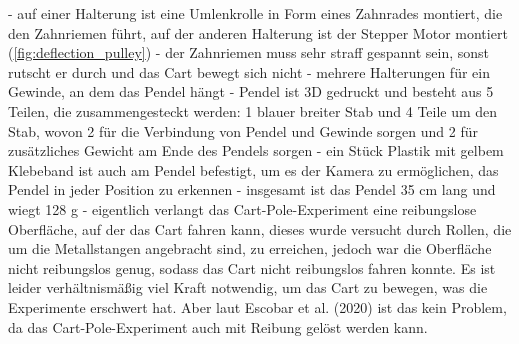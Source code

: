 - auf einer Halterung ist eine Umlenkrolle in Form eines Zahnrades montiert, die den Zahnriemen führt, auf der anderen Halterung ist der Stepper Motor montiert (\ref{fig:deflection_pulley})
- der Zahnriemen muss sehr straff gespannt sein, sonst rutscht er durch und das Cart bewegt sich nicht
- mehrere Halterungen für ein Gewinde, an dem das Pendel hängt
- Pendel ist 3D gedruckt und besteht aus 5 Teilen, die zusammengesteckt werden: 1 blauer breiter Stab und 4 Teile um den Stab, wovon 2 für die Verbindung von Pendel und Gewinde sorgen und 2 für zusätzliches Gewicht am Ende des Pendels sorgen
- ein Stück Plastik mit gelbem Klebeband ist auch am Pendel befestigt, um es der Kamera zu ermöglichen, das Pendel in jeder Position zu erkennen
- insgesamt ist das Pendel 35 cm lang und wiegt 128 g
- eigentlich verlangt das Cart-Pole-Experiment eine reibungslose Oberfläche, auf der das Cart fahren kann, dieses wurde versucht durch Rollen, die um die Metallstangen angebracht sind, zu erreichen, jedoch war die Oberfläche nicht reibungslos genug, sodass das Cart nicht reibungslos fahren konnte. Es ist leider verhältnismäßig viel Kraft notwendig, um das Cart zu bewegen, was die Experimente erschwert hat. Aber laut Escobar et al. (2020) ist das kein Problem, da das Cart-Pole-Experiment auch mit Reibung gelöst werden kann.

